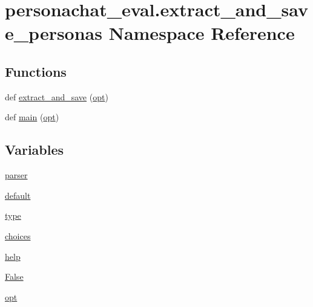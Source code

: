 \hypertarget{namespacepersonachat__eval_1_1extract__and__save__personas}{}\section{personachat\+\_\+eval.\+extract\+\_\+and\+\_\+save\+\_\+personas Namespace Reference}
\label{namespacepersonachat__eval_1_1extract__and__save__personas}
\subsection*{Functions}
\begin{DoxyCompactItemize}
\item 
def \hyperlink{namespacepersonachat__eval_1_1extract__and__save__personas_a7bae99c34a0b3f49cbce1328146926fd}{extract\+\_\+and\+\_\+save} (\hyperlink{namespacepersonachat__eval_1_1extract__and__save__personas_af8429edf17061783a8e88df2612ed634}{opt})
\item 
def \hyperlink{namespacepersonachat__eval_1_1extract__and__save__personas_aa39f496bc78dfa28c1fbc2c4129a915c}{main} (\hyperlink{namespacepersonachat__eval_1_1extract__and__save__personas_af8429edf17061783a8e88df2612ed634}{opt})
\end{DoxyCompactItemize}
\subsection*{Variables}
\begin{DoxyCompactItemize}
\item 
\hyperlink{namespacepersonachat__eval_1_1extract__and__save__personas_a0c7a023ff3a444b10a5a7241dcb2a654}{parser}
\item 
\hyperlink{namespacepersonachat__eval_1_1extract__and__save__personas_ad30dd7296027c9500819dc1c99da8bb7}{default}
\item 
\hyperlink{namespacepersonachat__eval_1_1extract__and__save__personas_aaa2aa8bccd8967599740aecfd4d8cde9}{type}
\item 
\hyperlink{namespacepersonachat__eval_1_1extract__and__save__personas_a62bbb0f78fbe1dca79fe9a5c30586588}{choices}
\item 
\hyperlink{namespacepersonachat__eval_1_1extract__and__save__personas_a691998cfb8d73e52c4ca6e116c026e31}{help}
\item 
\hyperlink{namespacepersonachat__eval_1_1extract__and__save__personas_a7badd33b93a306d071f1c5c813dcf242}{False}
\item 
\hyperlink{namespacepersonachat__eval_1_1extract__and__save__personas_af8429edf17061783a8e88df2612ed634}{opt}
\end{DoxyCompactItemize}


